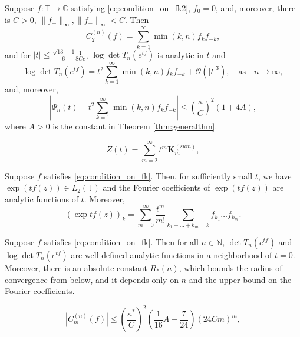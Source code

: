 \documentclass[10pt,a4paper]{amsart}
\begin{document}
\begin{theorem}\label{thm:determinant_expansion}
Suppose $f:\mathbb{T}\rightarrow\mathbb{C}$ satisfying \eqref{eq:condition_on_fk2}, $f_0=0$, and, moreover, there is $C>0$, $\|f_+\|_{\infty}, \|f_-\|_{\infty}< C$. Then
\begin{equation}
        C_2^{(n)}(f)= \sum_{k=1}^\infty \min (k,n) f_kf_{-k},
    \end{equation}
and for $|t|\leq 
\frac{\sqrt{13}-1}{6} 
\frac{1}{8Ce}$,
$\log\det T_n(e^{tf})$ is analytic in $t$ and
\begin{equation}
\log\det T_n(e^{tf})= t^2\sum_{k=1}^\infty \min (k,n) f_kf_{-k}+ \mathcal{O}(|t|^3),\quad\text{as}\quad n\rightarrow\infty,
\end{equation}
and, moreover,
$$|
\Psi_n(t)-t^2
\sum_{k=1}^{\infty} 
\min(k,n)
f_kf_{-k} 
|\leq \left(\frac{\kappa}{C}\right)^2(1+4A),$$
where $A>0$ is the constant in Theorem \ref{thm:generalthm}.
\end{theorem}

\begin{equation}\label{eqn:z(t)ksum}
Z(t)=\sum_{m=2}^{\infty}t^m\mathbf{K}_m^{(sum)},
\end{equation}

\begin{lemma}\label{lemma:barely_coefficients}
Suppose $f$ satisfies \eqref{eq:condition_on_fk}. Then, for sufficiently small $t$, we have $\exp({tf(z)})\in L_2(\mathbb T)$ and  the Fourier coefficients of $\exp({tf(z)})$ are analytic functions of $t$. Moreover, 
\begin{equation}\label{eqn:analytic_fc}
\left( \exp{tf(z)} \right)_k=\sum_{m=0}^{\infty}\frac{t^m}{m!}\sum_{k_1+\ldots+k_m=k} f_{k_1}\ldots f_{k_m}.
\end{equation}
\end{lemma}

\begin{proposition}\label{prop:analyticity_unbounded}
Suppose $f$ satisfies \eqref{eq:condition_on_fk}. Then for all $n\in\mathbb{N}$, $\det T_n(e^{tf})$ and $\log\det T_n(e^{tf})$ are well-defined analytic functions in a neighborhood of $t=0$. Moreover, there is an absolute constant $R_*(n)$, which bounds the radius of convergence from below, and it depends only on $n$ and the upper bound on the Fourier coefficients.
\end{proposition}

   \begin{equation}\label{eq:unbounded_case_cumulant_bound}
        \left|C_m^{(n)}(f)\right|\leq 
        \left(\frac{\kappa^*}{C}\right)^2 \left(\frac{1}{16}A +\frac{7}{24}
\right)\left(24Cm\right)^{m},
    \end{equation}
\end{document}
